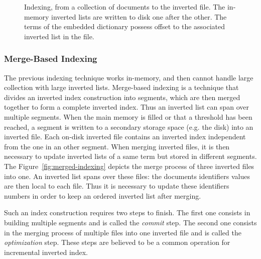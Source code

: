 \begin{figure}
\centering
{}%
\caption{Indexing, from a collection of documents to the inverted file. The
in-memory inverted lists are written to disk one after the other. The
terms of the embedded dictionary possess offset to the associated inverted list
in the file.}
\label{fig:indexing}
\end{figure}

\subsubsection{Merge-Based Indexing}

The previous indexing technique works in-memory, and then cannot handle large
collection with large inverted lists. Merge-based indexing is a technique that
divides an inverted index construction into segments, which are then merged
together to form a complete inverted index. Thus an inverted list can span
over multiple segments. When the main memory is filled or that a threshold has
been reached, a segment is written to a secondary storage space (e.g. the disk)
into an inverted file. Each on-disk inverted file contains an inverted index
independent from the one in an other segment. When merging inverted files, it is
then necessary to update inverted lists of a same term but stored in different
segments. The Figure~\ref{fig:merged-indexing} depicts the merge process of
three inverted files into one. An inverted list spans over these files: the
documents identifiers values are then local to each file. Thus it is necessary
to update these identifiers numbers in order to keep an ordered inverted list
after merging.

Such an index construction requires two steps to finish. The first one consists
in building multiple segments and is called the \emph{commit} step. The second
one consists in the merging process of multiple files into one inverted file
and is called the \emph{optimization} step. These steps are believed to
be a common operation for incremental inverted index.

